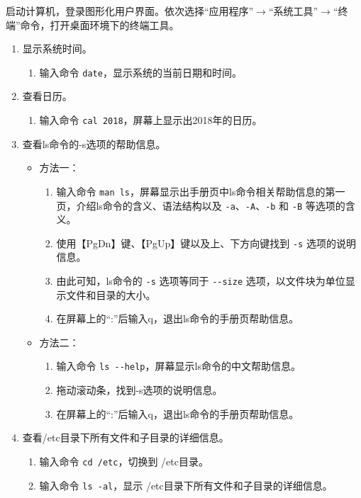 启动计算机，登录图形化用户界面。依次选择“应用程序”$\rightarrow$“系统工具”$\rightarrow$“终端”命令，打开桌面环境下的终端工具。
\begin{enumerate}
  \item 显示系统时间。
    \begin{enumerate}
      \item 输入命令 \verb|date|，显示系统的当前日期和时间。
    \end{enumerate}
  \item 查看日历。
    \begin{enumerate}
      \item 输入命令 \verb|cal 2018|，屏幕上显示出2018年的日历。
    \end{enumerate}
  \item 查看ls命令的-s选项的帮助信息。
    \begin{itemize}
      \item 方法一：
	\begin{enumerate}
	  \item 输入命令 \verb|man ls|，屏幕显示出手册页中ls命令相关帮助信息的第一页，介绍ls命令的含义、语法结构以及 \verb|-a|、\verb|-A|、\verb|-b| 和 \verb|-B| 等选项的含义。
	  \item 使用【PgDn】键、【PgUp】键以及上、下方向键找到 \verb|-s| 选项的说明信息。
	  \item 由此可知，ls命令的 \verb|-s| 选项等同于 \verb|--size| 选项，以文件块为单位显示文件和目录的大小。
	  \item 在屏幕上的“:”后输入q，退出ls命令的手册页帮助信息。
	\end{enumerate}
      \item 方法二：
	\begin{enumerate}
	  \item 输入命令 \verb|ls --help|，屏幕显示ls命令的中文帮助信息。
	  \item 拖动滚动条，找到-s选项的说明信息。
	  \item 在屏幕上的“:”后输入q，退出ls命令的手册页帮助信息。
	\end{enumerate}
    \end{itemize}
  \item 查看/etc目录下所有文件和子目录的详细信息。
    \begin{enumerate}
      \item 输入命令 \verb|cd /etc|，切换到 /etc目录。
      \item 输入命令 \verb|ls -al|，显示 /etc目录下所有文件和子目录的详细信息。
    \end{enumerate}
\end{enumerate}

